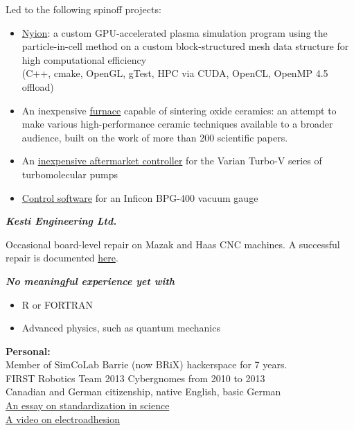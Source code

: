 \documentclass[fleqn,11pt]{article}
\newcommand{\ressection}[1]{\textbf{{\Large \textit{#1}}}\xrfill[0.1ex]{0.6pt}}
\newcommand{\itemoptions}{\setlength{\itemindent}{-10pt} \setlength\itemsep{-1em}}
\begin{document}
Led to the following spinoff projects:
\begin{itemize}\itemoptions
	\item \href{https://github.com/0xDBFB7/Nyion}{Nyion}: a custom GPU-accelerated plasma simulation program using the particle-in-cell method on a custom block-structured mesh data structure for high computational efficiency\\
	(C++, cmake, OpenGL, gTest, HPC via CUDA, OpenCL, OpenMP 4.5 offload)
	\item An inexpensive \href{https://0xdbfb7.com/furnace.html}{furnace} capable of sintering oxide ceramics: an attempt to make various high-performance ceramic techniques available to a broader audience, built on the work of more than 200 scientific papers. 
	\item An \href{https://github.com/0xDBFB7/varian-turbo-controller}{inexpensive aftermarket controller} for the Varian Turbo-V series of turbomolecular pumps 
	\item \href{https://gist.github.com/0xDBFB7/7bd7048c6639270e6f291a2673903184}{Control software} for an Inficon BPG-400 vacuum gauge
\end{itemize}

\ressection{Kesti Engineering Ltd.}

Occasional board-level repair on Mazak and Haas CNC machines. A successful repair is documented \href{https://0xdbfb7.com/meldas.html}{here}.

\ressection{No meaningful experience yet with}

\begin{itemize}\itemoptions
	\item R or FORTRAN
	\item Advanced physics, such as quantum mechanics
\end{itemize}


\light{\makebox[\linewidth]{\rule{\textwidth}{0.4pt}}}


%
\begin{tcolorbox}
	\textbf{Personal:\\}
	Member of SimCoLab Barrie (now BRiX) hackerspace for 7 years.\\
	FIRST Robotics Team 2013 Cybergnomes from 2010 to 2013\\
	Canadian and German citizenship, native English, basic German\\
	\href{https://github.com/0xDBFB7/scientific_standards}{An essay on standardization in science}\\
	\href{https://www.youtube.com/watch?v=TQFxafFIoNM}{A video on electroadhesion}
\end{tcolorbox}
%
\end{document}
